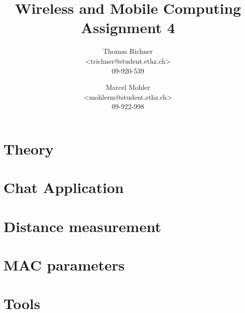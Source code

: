 \documentclass[11pt]{article}
\title{\textbf{Wireless and Mobile Computing 
\newline
Assignment 4}}
\author{
Thomas Richner\\
\textless trichner@student.ethz.ch\textgreater\\
09-920-539
\and
Marcel Mohler\\
\textless mohlerm@student.ethz.ch\textgreater\\
09-922-998
}
\begin{document}
\maketitle

\section{Theory}
 

\section{Chat Application}
  
 
\section{Distance measurement} 


\section{MAC parameters}


\section{Tools}

\end{document}
